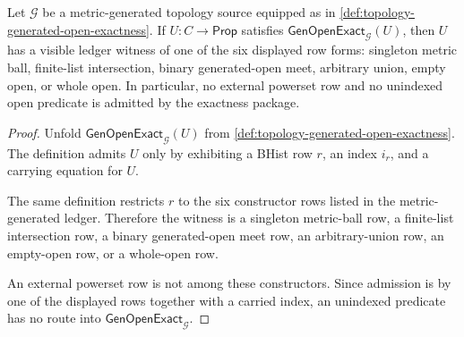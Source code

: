\begin{theorem}
\label{thm:topology-generated-open-row-coverage}
Let $\mathcal{G}$ be a metric-generated topology source equipped as in \autoref{def:topology-generated-open-exactness}. If $U:C\to\mathsf{Prop}$ satisfies $\mathsf{GenOpenExact}_{\mathcal{G}}(U)$, then $U$ has a visible ledger witness of one of the six displayed row forms: singleton metric ball, finite-list intersection, binary generated-open meet, arbitrary union, empty open, or whole open. In particular, no external powerset row and no unindexed open predicate is admitted by the exactness package.
\end{theorem}
\begin{proof}
Unfold $\mathsf{GenOpenExact}_{\mathcal{G}}(U)$ from \autoref{def:topology-generated-open-exactness}. The definition admits $U$ only by exhibiting a BHist row $r$, an index $i_r$, and a carrying equation for $U$.

The same definition restricts $r$ to the six constructor rows listed in the metric-generated ledger. Therefore the witness is a singleton metric-ball row, a finite-list intersection row, a binary generated-open meet row, an arbitrary-union row, an empty-open row, or a whole-open row.

An external powerset row is not among these constructors. Since admission is by one of the displayed rows together with a carried index, an unindexed predicate has no route into $\mathsf{GenOpenExact}_{\mathcal{G}}$.
\end{proof}

